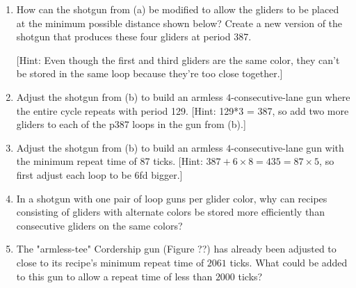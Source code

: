 \begin{multicols}{2}
\begin{problem}
\begin{enumerate}[label=\bf\color{ocre}(\alph*)]
			\begin{center}
			\end{center}
			
			to build an armless $4$-consecutive-lane shotgun like the one from Figure~\ref{fig:armless_4_lane_gun}, but with period 387.
			\item How can the shotgun from (a) be modified to allow the gliders to be placed at the minimum possible distance shown below? Create a new version of the shotgun that produces these four gliders at period 387.
			
			\begin{center}
			\end{center}
			
			[Hint: Even though the first and third gliders are the same color, they can't be stored in the same loop because they're too close together.]
			\item Adjust the shotgun from (b) to build an armless $4$-consecutive-lane gun where the entire cycle repeats with period 129.  [Hint: 129*3 = 387, so add two more gliders to each of the p387 loops in the gun from (b).]
			\item Adjust the shotgun from (b) to build an armless $4$-consecutive-lane gun with the minimum repeat time of 87 ticks.  [Hint: $387+6 \times 8 = 435 = 87\times5$, so first adjust each loop to be 6fd bigger.]
			\item In a shotgun with one pair of loop guns per glider color, why can recipes consisting of gliders with alternate colors be stored more efficiently than consecutive gliders on the same colors?
			\item The "armless-tee" Cordership gun (Figure ??) has already been adjusted to close to its recipe's minimum repeat time of $2061$ ticks. What could be added to this gun to allow a repeat time of less than $2000$ ticks?

\end{enumerate}
\end{problem}
\end{multicols}
